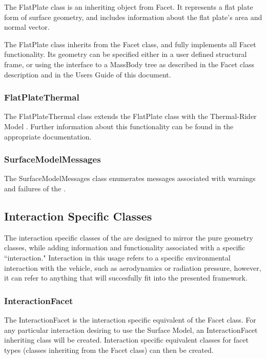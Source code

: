The FlatPlate class is an inheriting object from Facet. It represents a flat
plate form of surface geometry, and includes information about the flat plate's
area and normal vector.

The FlatPlate class inherits from the Facet class, and fully implements
all Facet functionality. Its geometry can be specified either
in a user defined structural frame, or using the interface to a
MassBody tree
as described in the Facet class description and in the Users Guide
of this document.

\subsubsection{FlatPlateThermal}

The FlatPlateThermal class extends the FlatPlate class with the
Thermal-Rider Model \cite{dynenv:THERMALRIDER}. Further information
about this functionality can be found in the appropriate documentation.

\subsubsection{SurfaceModelMessages}

The SurfaceModelMessages class enumerates messages associated with
warnings and failures of the \ModelDesc.

\subsection{Interaction Specific Classes}

The interaction specific classes of the \ModelDesc are designed to mirror
the pure geometry classes, while adding information and functionality
associated with a specific ``interaction." Interaction in this usage refers
to a specific environmental interaction with the vehicle, such as aerodynamics
or radiation pressure, however, it can refer to anything that will succesfully
fit into the presented framework.

\subsubsection{InteractionFacet}

The InteractionFacet is the interaction specific equivalent of the Facet class.
For any particular interaction desiring to use the Surface Model, an
InteractionFacet inheriting class will be created. Interaction specific
equivalent classes for facet types (classes inheriting from the Facet
class) can then be created. 

